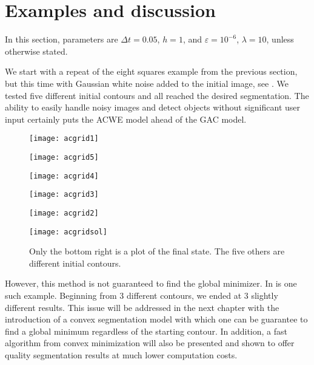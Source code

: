 \section{Examples and discussion}
In this section, parameters are $\Delta t = 0.05$, $h = 1$, and $\varepsilon = 10^{-6}$, $\lambda = 10$, unless otherwise stated.

We start with a repeat of the eight squares example from the previous section, but this time with Gaussian white noise added to the initial image, see . We tested five different initial contours and all reached the desired segmentation. The ability to easily handle noisy images and detect objects without significant user input certainly puts the ACWE model ahead of the GAC model.

\begin{figure}[htb!]
	\centering
	\begin{minipage}{0.31\textwidth}
		\texttt{[image: acgrid1]}
	\end{minipage}%
	\begin{minipage}{0.31\textwidth}
		\texttt{[image: acgrid5]}
	\end{minipage}%
	\begin{minipage}{0.31\textwidth}
		\texttt{[image: acgrid4]}
	\end{minipage}
	\begin{minipage}{0.31\textwidth}
		\texttt{[image: acgrid3]}
	\end{minipage}%
	\begin{minipage}{0.31\textwidth}
		\texttt{[image: acgrid2]}
	\end{minipage}%
	\begin{minipage}{0.31\textwidth}
		\texttt{[image: acgridsol]}
	\end{minipage}
	
	\caption{Only the bottom right  is a plot of the final state. The five others are different initial contours.}
	\label{fig:grid_acwe}
\end{figure}
However, this method is not guaranteed to find the global minimizer. In  is one such example. Beginning from 3 different contours, we ended at 3 slightly different results. This issue will be addressed in the next chapter with the introduction of a convex segmentation model with which one can be guarantee to find a global minimum regardless of the starting contour. In addition, a fast algorithm from convex minimization will also be presented and shown to offer quality segmentation results at much lower computation costs.
